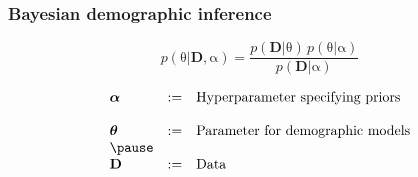 \documentclass{beamer}
\newcommand{\greekbf}[1]{\boldsymbol{\mathrm{#1}}}
\begin{document}
\begin{frame}
  \frametitle{Bayesian demographic inference}
  \begin{center}
	\begin{equation*}
          p(\greekbf{\theta}|\mathbf{D},\greekbf{\alpha}) = \frac{p(\mathbf{D}|\greekbf{\theta}) \, p(\greekbf{\theta}|\greekbf{\alpha})}{p(\mathbf{D}|\greekbf{\alpha})}
        \end{equation*}
  \end{center}

  \pause
  \begin{center}
          \begin{equation*}
            \begin{array}{lll}
	      \greekbf{\alpha} & := & \mbox{Hyperparameter specifying priors}\\
                               &    &\\
              \greekbf{\theta} & := & \mbox{Parameter for demographic models}\\
	      \pause
                               &    &\\
              \mathbf{D}       & := & \mbox{Data}\\
                               &    &\\
            \end{array}
          \end{equation*}
  \end{center}
\end{frame}
\end{document}
